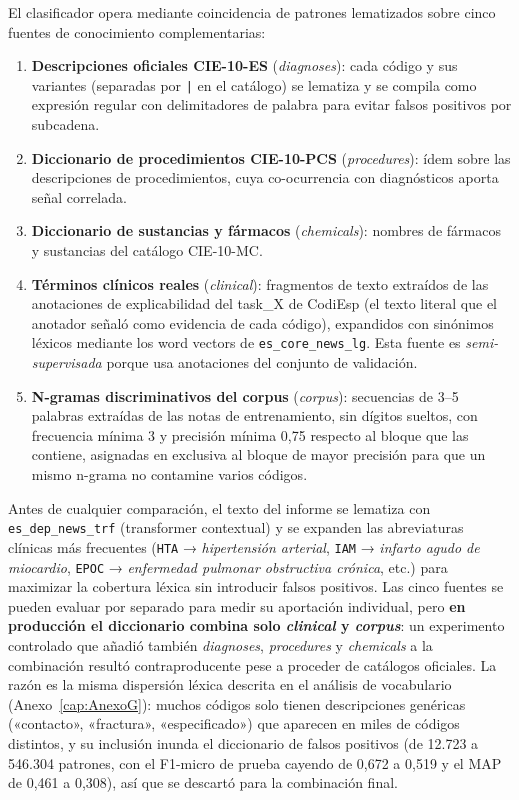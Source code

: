 El clasificador opera mediante coincidencia de patrones lematizados sobre cinco fuentes de conocimiento complementarias:

\begin{enumerate}
 \item \textbf{Descripciones oficiales CIE-10-ES} (\emph{diagnoses}): cada código y sus variantes (separadas por \texttt{|} en el catálogo) se lematiza y se compila como expresión regular con delimitadores de palabra para evitar falsos positivos por subcadena.
 \item \textbf{Diccionario de procedimientos CIE-10-PCS} (\emph{procedures}): ídem sobre las descripciones de procedimientos, cuya co-ocurrencia con diagnósticos aporta señal correlada.
 \item \textbf{Diccionario de sustancias y fármacos} (\emph{chemicals}): nombres de fármacos y sustancias del catálogo CIE-10-MC.
 \item \textbf{Términos clínicos reales} (\emph{clinical}): fragmentos de texto extraídos de las anotaciones de explicabilidad del task\_X de CodiEsp (el texto literal que el anotador señaló como evidencia de cada código), expandidos con sinónimos léxicos mediante los word vectors de \texttt{es\_core\_news\_lg}. Esta fuente es \emph{semi-supervisada} porque usa anotaciones del conjunto de validación.
 \item \textbf{N-gramas discriminativos del corpus} (\emph{corpus}): secuencias de 3--5 palabras extraídas de las notas de entrenamiento, sin dígitos sueltos, con frecuencia mínima 3 y precisión mínima 0,75 respecto al bloque que las contiene, asignadas en exclusiva al bloque de mayor precisión para que un mismo n-grama no contamine varios códigos.
\end{enumerate}

Antes de cualquier comparación, el texto del informe se lematiza con \texttt{es\_dep\_news\_trf} (transformer contextual) y se expanden las abreviaturas clínicas más frecuentes (\texttt{HTA} → \emph{hipertensión arterial}, \texttt{IAM} → \emph{infarto agudo de miocardio}, \texttt{EPOC} → \emph{enfermedad pulmonar obstructiva crónica}, etc.) para maximizar la cobertura léxica sin introducir falsos positivos. Las cinco fuentes se pueden evaluar por separado para medir su aportación individual, pero \textbf{en producción el diccionario combina solo \emph{clinical} y \emph{corpus}}: un experimento controlado que añadió también \emph{diagnoses}, \emph{procedures} y \emph{chemicals} a la combinación resultó contraproducente pese a proceder de catálogos oficiales. La razón es la misma dispersión léxica descrita en el análisis de vocabulario (Anexo~\ref{cap:AnexoG}): muchos códigos solo tienen descripciones genéricas («contacto», «fractura», «especificado») que aparecen en miles de códigos distintos, y su inclusión inunda el diccionario de falsos positivos (de 12.723 a 546.304 patrones, con el F1-micro de prueba cayendo de 0,672 a 0,519 y el MAP de 0,461 a 0,308), así que se descartó para la combinación final.

